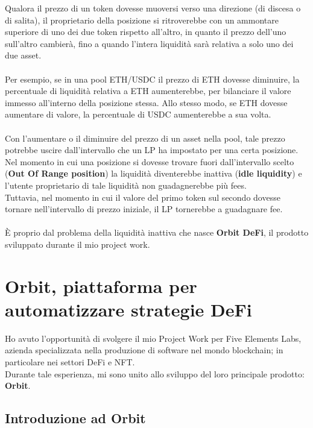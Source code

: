 \documentclass[12pt,a4paper]{report}
\begin{document}
Qualora il prezzo di un token dovesse muoversi verso una direzione (di discesa o di salita), il proprietario della posizione si ritroverebbe con un ammontare superiore di uno dei due token rispetto all'altro, in quanto il prezzo dell'uno sull'altro cambierà, fino a quando l'intera liquidità sarà relativa a solo uno dei due asset.
\\\\Per esempio, se in una pool ETH/USDC il prezzo di ETH dovesse diminuire, la percentuale di liquidità relativa a ETH aumenterebbe, per bilanciare il valore immesso all'interno della posizione stessa.
Allo stesso modo, se ETH dovesse aumentare di valore, la percentuale di USDC aumenterebbe a sua volta.
\\\\Con l'aumentare o il diminuire del prezzo di un asset nella pool, tale prezzo potrebbe uscire dall'intervallo che un LP ha impostato per una certa posizione. Nel momento in cui una posizione si dovesse trovare fuori dall'intervallo scelto (\textbf{Out Of Range position}) la liquidità diventerebbe inattiva (\textbf{idle liquidity}) e l'utente proprietario di tale liquidità non guadagnerebbe più fees.
\\Tuttavia, nel momento in cui il valore del primo token sul secondo dovesse tornare nell'intervallo di prezzo iniziale, il LP tornerebbe a guadagnare fee.
\\\\È proprio dal problema della liquidità inattiva che nasce \textbf{Orbit DeFi}, il prodotto sviluppato durante il mio project work.







\chapter{Orbit, piattaforma per automatizzare strategie DeFi}

Ho avuto l'opportunità di svolgere il mio Project Work per Five Elements Labs, azienda specializzata nella produzione di software nel mondo blockchain; in particolare nei settori DeFi e NFT.
\\Durante tale esperienza, mi sono unito allo sviluppo del loro principale prodotto: \textbf{Orbit}\cite{orbit_website}.

\section{Introduzione ad Orbit}
\end{document}
